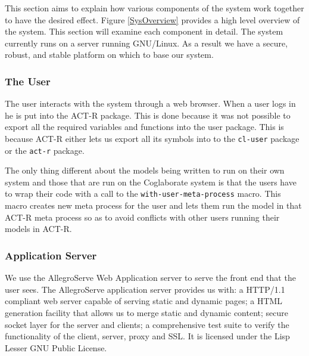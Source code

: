 This section aims to explain how various components of the system work
together to have the desired effect. Figure \ref{SysOverview} provides
a high level overview of the system.  This section will examine each
component in detail.  The system currently runs on a server running
GNU\slash Linux.  As a result we have a secure, robust, and stable
platform on which to base our system.


\subsubsection{The User}

The user interacts with the system through a web browser. When a user
logs in he is put into the ACT-R package. This is done because it was
not possible to export all the required variables and functions into
the user package. This is because ACT-R either lets us export all its
symbols into to the \texttt{cl-user} package or the \texttt{act-r}
package. 

The only thing different about the models being written to run on
their own system and those that are run on the Coglaborate system is
that the users have to wrap their code with a call to the
\texttt{with-user-meta-process} macro. This macro creates new meta
process for the user and lets them run the model in that ACT-R meta
process so as to avoid conflicts with other users running their models
in ACT-R. 

\subsubsection{Application Server}

We use the AllegroServe Web Application server to serve the front end
that the user sees. The AllegroServe\cite{aserve2009} application server provides us
with: a HTTP/1.1 compliant web server capable of serving static and
dynamic pages; a HTML generation facility that allows us to merge
static and dynamic content; secure socket layer for the server and
clients; a comprehensive test suite to verify the functionality of the
client, server, proxy and SSL. It is licensed under the Lisp Lesser
GNU Public License. 

